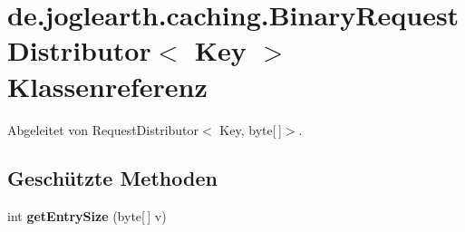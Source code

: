 \section{de.\-joglearth.\-caching.\-Binary\-Request\-Distributor$<$ \-Key $>$ \-Klassenreferenz}
\label{classde_1_1joglearth_1_1caching_1_1_binary_request_distributor_3_01_key_01_4}


\-Abgeleitet von \-Request\-Distributor$<$ Key, byte[$\,$]$>$.

\subsection*{\-Geschützte \-Methoden}
\begin{DoxyCompactItemize}
\item 
int {\bfseries get\-Entry\-Size} (byte[$\,$] v)\label{classde_1_1joglearth_1_1caching_1_1_binary_request_distributor_3_01_key_01_4_a6ed84c345f9173742c5982bc455c7325}

\end{DoxyCompactItemize}
